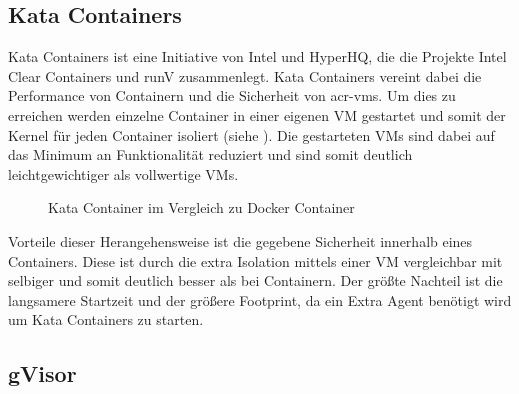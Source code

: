 \subsection{Kata Containers}
\label{sec:compVMbasedKata}

Kata Containers ist eine Initiative von Intel und HyperHQ, die die Projekte Intel Clear Containers und runV zusammenlegt. Kata Containers vereint dabei die Performance von Containern und die Sicherheit von \glspl{acr-vm}. Um dies zu erreichen werden einzelne Container in einer eigenen VM gestartet und somit der Kernel für jeden Container isoliert (siehe ). Die gestarteten VMs sind dabei auf das Minimum an Funktionalität reduziert und sind somit deutlich leichtgewichtiger als vollwertige VMs.

\begin{figure}[h]
	\hfill
	\caption{Kata Container im Vergleich zu Docker Container}
	\label{fig:kataContainers}
\end{figure}

Vorteile dieser Herangehensweise ist die gegebene Sicherheit innerhalb eines Containers. Diese ist durch die extra Isolation mittels einer VM vergleichbar mit selbiger und somit deutlich besser als bei Containern. Der größte Nachteil ist die langsamere Startzeit und der größere Footprint, da ein Extra Agent benötigt wird um Kata Containers zu starten.

\subsection{gVisor}
\label{sec:compVMbasedGVisor}

